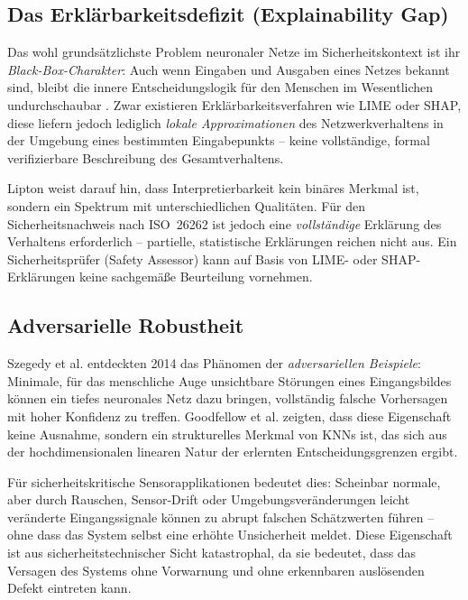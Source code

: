 ﻿\documentclass[12pt,a4paper]{article}
\begin{document}
\subsection{Das Erkl\"arbarkeitsdefizit (Explainability Gap)}
\label{subsec:explainability}

Das wohl grunds\"atzlichste Problem neuronaler Netze im Sicherheitskontext ist ihr
\emph{Black-Box-Charakter}: Auch wenn Eingaben und Ausgaben eines Netzes bekannt sind,
bleibt die innere Entscheidungslogik f\"ur den Menschen im Wesentlichen undurchschaubar
\cite{Doshi2017}. Zwar existieren Erkl\"arbarkeitsverfahren wie LIME \cite{Ribeiro2016}
oder SHAP, diese liefern jedoch lediglich \emph{lokale Approximationen} des Netzwerkverhaltens
in der Umgebung eines bestimmten Eingabepunkts -- keine vollst\"andige, formal verifizierbare
Beschreibung des Gesamtverhaltens.

Lipton \cite{Lipton2018} weist darauf hin, dass Interpretierbarkeit kein bin\"ares Merkmal
ist, sondern ein Spektrum mit unterschiedlichen Qualit\"aten. F\"ur den Sicherheitsnachweis
nach ISO~26262 ist jedoch eine \emph{vollst\"andige} Erkl\"arung des Verhaltens
erforderlich -- partielle, statistische Erkl\"arungen reichen nicht aus. Ein
Sicherheitspr\"ufer (Safety Assessor) kann auf Basis von LIME- oder SHAP-Erkl\"arungen
keine sachgem\"a\ss{}e Beurteilung vornehmen.

\subsection{Adversarielle Robustheit}
\label{subsec:adversarial}

Szegedy et al. \cite{Szegedy2014} entdeckten 2014 das Ph\"anomen der
\emph{adversariellen Beispiele}: Minimale, f\"ur das menschliche Auge unsichtbare
St\"orungen eines Eingangsbildes k\"onnen ein tiefes neuronales Netz dazu bringen,
vollst\"andig falsche Vorhersagen mit hoher Konfidenz zu treffen. Goodfellow et al.
\cite{Goodfellow2015} zeigten, dass diese Eigenschaft keine Ausnahme, sondern
ein strukturelles Merkmal von KNNs ist, das sich aus der hochdimensionalen linearen
Natur der erlernten Entscheidungsgrenzen ergibt.

F\"ur sicherheitskritische Sensorapplikationen bedeutet dies: Scheinbar normale,
aber durch Rauschen, Sensor-Drift oder Umgebungsver\"anderungen leicht ver\"anderte
Eingangssignale k\"onnen zu abrupt falschen Sch\"atzwerten f\"uhren -- ohne dass das
System selbst eine erh\"ohte Unsicherheit meldet. Diese Eigenschaft ist aus
sicherheitstechnischer Sicht katastrophal, da sie bedeutet, dass das Versagen des
Systems ohne Vorwarnung und ohne erkennbaren ausl\"osenden Defekt eintreten kann.
\end{document}
